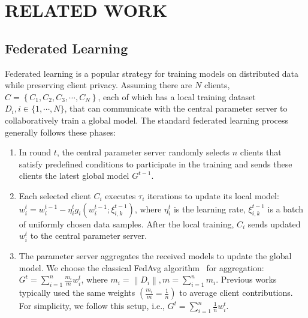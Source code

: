 \section{RELATED WORK}
\subsection{Federated Learning}
Federated learning is a popular strategy for training models on distributed data while preserving client privacy. Assuming there are $N$ clients, $ C = \left \{ C_{1}, C_{2}, C_{3},\cdots, C_{N}  \right \} $, each of which has a local training dataset $D_{i}, i\in \{1,\cdots, N\}$, that can communicate with the central parameter server to collaboratively train a global model. The standard federated learning process generally follows these phases:
\begin{enumerate}
  \item  In round $t$, the central parameter server randomly selects $n$ clients that satisfy predefined conditions to participate in the training and sends these clients the latest global model $ G^{t-1}$.
%
  \item Each selected client $C_i$ executes $\tau _{i}$ iterations to update its local model: $w_{i}^{t}= w_{i}^{t-1}-\eta_{i}^t g_{i}\left (  w_{i}^{t-1};\xi_{i,k}^{t-1}  \right )$, where $\eta _{i}^t$ is the learning rate, $\xi_{i,k}^{t-1}$ is a batch of uniformly chosen data samples. After the local training, $C_i$ sends updated $w_{i}^{t}$ to the central parameter server. 
  \item The parameter server aggregates the received models to update the global model. We choose the classical FedAvg algorithm~\cite{fedavg} for aggregation: $ G^{t} = {\textstyle \sum_{i=1}^{n}} \frac{ m_{i} }{m} w_{i}^{t}$, where $m_{i} = \left \| D_{i}  \right \|,m= {\textstyle \sum_{i=1}^{n}m_{i} } $. Previous works~\cite{howtobackdoor,xie2020dba,krum} typically used the same weights $\left ( \frac{ m_{i} }{m} =\frac{1}{n}  \right ) $  to average client contributions. For simplicity, we follow this setup, i.e., $G^{t} = {\textstyle \sum_{i=1}^{n}} \frac{1}{n} w_{i}^{t}$.

\end{enumerate}


